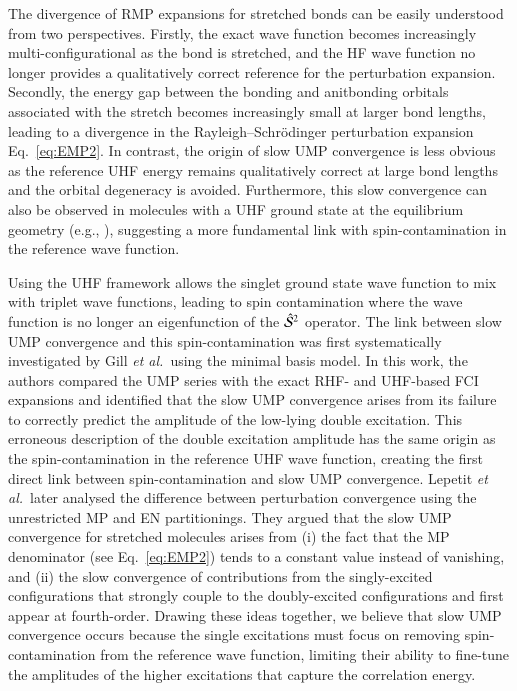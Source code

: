 \documentclass[aps,prb,reprint,noshowkeys,linenumbers,superscriptaddress]{revtex4-1}
\newcommand{\latin}[1]{#1}
\newcommand{\eg}{\latin{e.g.}}
\newcommand{\etal}{\textit{et al.}}
\newcommand{\cS}{\mathcal{S}}
\begin{document}
The divergence of RMP expansions for stretched bonds can be easily understood from two perspectives.\cite{Gill_1988a}
Firstly, the exact wave function becomes increasingly multi-configurational as the bond is stretched, and the 
HF wave function no longer provides a qualitatively correct reference for the perturbation expansion.
Secondly, the energy gap between the bonding and anitbonding orbitals associated with the stretch becomes
increasingly small at larger bond lengths, leading to a divergence in the Rayleigh--Schr\"odinger perturbation
expansion Eq.~\eqref{eq:EMP2}.
In contrast, the origin of slow UMP convergence is less obvious as the reference UHF energy remains
qualitatively correct at large bond lengths and the orbital degeneracy is avoided.
Furthermore, this slow convergence can also be observed in molecules with a UHF ground state at the equilibrium
geometry (\eg, ), suggesting a more fundamental link with spin-contamination 
in the reference wave function.\cite{Nobes_1987}

Using the UHF framework allows the singlet ground state wave function to mix with triplet wave functions, 
leading to spin contamination where the wave function is no longer an eigenfunction of the $\Hat{\cS}^2$ operator.
The link between slow UMP convergence and this spin-contamination was first systematically investigated
by Gill \etal\ using the minimal basis  model.\cite{Gill_1988}
In this work, the authors compared the UMP series with the exact RHF- and UHF-based FCI expansions
and identified that the slow UMP convergence arises from its failure to correctly predict the amplitude of the
low-lying double excitation.
This erroneous description of the double excitation amplitude has the same origin as the spin-contamination in the reference
UHF wave function, creating the first direct link between spin-contamination and slow UMP convergence.\cite{Gill_1988}
Lepetit \etal\ later analysed the difference between perturbation convergence using the unrestricted MP 
and EN partitionings. \cite{Lepetit_1988}
They argued that the slow UMP convergence for stretched molecules arises from 
(i) the fact that the MP denominator (see Eq.~\ref{eq:EMP2})
tends to a constant value instead of vanishing, and (ii) the slow convergence of contributions from the 
singly-excited configurations that strongly couple to the doubly-excited configurations and first
appear at fourth-order.\cite{Lepetit_1988}
Drawing these ideas together, we believe that slow UMP convergence occurs because the single excitations must focus on removing
spin-contamination from the reference wave function, limiting their ability to fine-tune the amplitudes of the higher 
excitations that capture the correlation energy.
\end{document}
